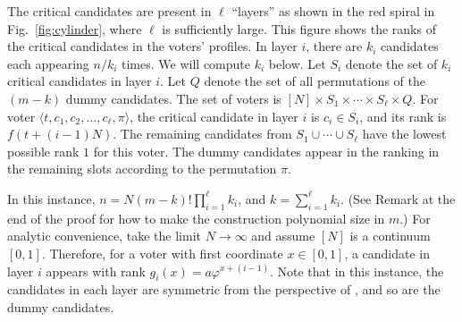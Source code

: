 The critical candidates are present in $\ell$ ``layers'' as shown in the red spiral in Fig.~\ref{fig:cylinder}, where $\ell$ is sufficiently large. This figure shows the ranks of the critical candidates in the voters' profiles. In layer $i$, there are $k_i$ candidates each appearing $n/k_i$ times. We will compute $k_i$ below. Let $S_i$ denote the set of $k_i$ critical candidates in layer $i$. Let $Q$ denote the set of all permutations of the $(m-k)$ dummy candidates. The set of voters is $[N] \times S_1 \times \cdots \times S_{\ell} \times Q$. For voter $\langle t, c_1, c_2, \ldots, c_{\ell}, \pi \rangle$, the critical candidate in layer $i$ is $c_i \in S_i$, and its rank is $f(t + (i-1)N)$. The remaining candidates from $S_1 \cup \cdots \cup S_{\ell}$ have the lowest possible rank $1$ for this voter. The dummy candidates appear in the ranking in the remaining slots according to the permutation $\pi$.

In this instance, $n = N (m-k)! \prod_{i=1}^{\ell} k_i$, and $k = \sum_{i=1}^{\ell} k_i$. (See Remark at the end of the proof for how to make the construction polynomial size in $m$.) For analytic convenience, take the limit $N \rightarrow \infty$ and assume $[N]$ is a continuum $[0,1]$. Therefore, for a voter with first coordinate $x \in [0,1]$, a candidate in layer $i$ appears with rank $g_i(x) = a\varphi^{x + (i-1)}$. Note that in this instance, the candidates in each layer are symmetric from the perspective of \g{}, and so are the dummy candidates.


%



